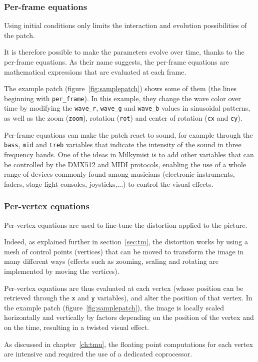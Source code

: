\documentclass[a4paper,11pt]{kthesis}
\begin{document}
\subsubsection{Per-frame equations}
Using initial conditions only limits the interaction and evolution possibilities of the patch.

It is therefore possible to make the parameters evolve over time, thanks to the per-frame equations. As their name suggests, the per-frame equations are mathematical expressions that are evaluated at each frame.

The example patch (figure~\ref{fig:samplepatch}) shows some of them (the lines beginning with \verb!per_frame!). In this example, they change the wave color over time by modifying the \verb!wave_r!, \verb!wave_g! and \verb!wave_b! values in sinusoidal patterns, as well as the zoom (\verb!zoom!), rotation (\verb!rot!) and center of rotation (\verb!cx! and \verb!cy!).

Per-frame equations can make the patch react to sound, for example through the \verb!bass!, \verb!mid! and \verb!treb! variables that indicate the intensity of the sound in three frequency bands. One of the ideas in Milkymist is to add other variables that can be controlled by the DMX512 and MIDI protocols, enabling the use of a whole range of devices commonly found among musicians (electronic instruments, faders, stage light consoles, joysticks,...) to control the visual effects.

\subsubsection{Per-vertex equations}
Per-vertex equations are used to fine-tune the distortion applied to the picture.

Indeed, as explained further in section~\ref{sec:tm}, the distortion works by using a mesh of control points (vertices) that can be moved to transform the image in many different ways (effects such as zooming, scaling and rotating are implemented by moving the vertices).

Per-vertex equations are thus evaluated at each vertex (whose position can be retrieved through the \verb!x! and \verb!y! variables), and alter the position of that vertex. In the example patch (figure~\ref{fig:samplepatch}), the image is locally scaled horizontally and vertically by factors depending on the position of the vertex and on the time, resulting in a twisted visual effect.

As discussed in chapter~\ref{ch:tmu}, the floating point computations for each vertex are intensive and required the use of a dedicated coprocessor.
\end{document}
